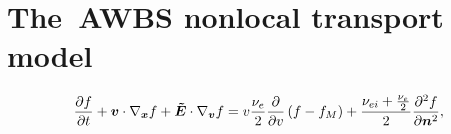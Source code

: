 \section{The~AWBS nonlocal transport model}
\label{sec:AWBSmodel}
\begin{equation}
  \frac{\partial{f}}{\partial{t}} + \boldsymbol{v}\cdot\nabla_{\boldsymbol{x}} f + \boldsymbol{\tilde{E}} \cdot\nabla_{\boldsymbol{v}} f =
  v \frac{\nu_{e}}{2}\frac{\partial{}}{\partial{v}}\left(f - f_M\right) 
  + \frac{\nu_{ei} + \frac{\nu_{e}}{2}}{2} \frac{\partial^2 f}{\partial \boldsymbol{n}^2}
  , \label{eq:AWBS_model}
\end{equation}
\cite{Fish_RMP1987}
